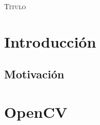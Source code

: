 \documentclass[a4paper,openright, 12pt]{book}
\begin{document}
\begin{titlepage}
\begin{center}
\begin{Huge}
\textsc{Título}
\end{Huge}
\end{center}
\end{titlepage}

\newpage
\mbox{}
\thispagestyle{empty} 


\tableofcontents %
\newpage
\thispagestyle{empty}


\chapter{Introducción}\label{cap.introduccion}

\section{Motivación}
\chapter{OpenCV}
\end{document}
